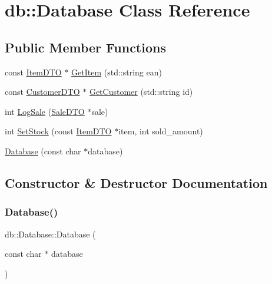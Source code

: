\hypertarget{classdb_1_1Database}{}\section{db\+:\+:Database Class Reference}
\label{classdb_1_1Database}
\subsection*{Public Member Functions}
\begin{DoxyCompactItemize}
\item 
const \mbox{\hyperlink{classdb_1_1ItemDTO}{Item\+D\+TO}} $\ast$ \mbox{\hyperlink{classdb_1_1Database_a1fb85ca95813c5b08fa337ee876dcc77}{Get\+Item}} (std\+::string ean)
\item 
const \mbox{\hyperlink{classdb_1_1CustomerDTO}{Customer\+D\+TO}} $\ast$ \mbox{\hyperlink{classdb_1_1Database_a50871011cdeb0a80894f08549240c3fa}{Get\+Customer}} (std\+::string id)
\item 
int \mbox{\hyperlink{classdb_1_1Database_ac2aef162b74c917acdaf11794422c415}{Log\+Sale}} (\mbox{\hyperlink{classdb_1_1SaleDTO}{Sale\+D\+TO}} $\ast$sale)
\item 
int \mbox{\hyperlink{classdb_1_1Database_a777611636e84a82dc2bbd2be10491bb7}{Set\+Stock}} (const \mbox{\hyperlink{classdb_1_1ItemDTO}{Item\+D\+TO}} $\ast$item, int sold\+\_\+amount)
\item 
\mbox{\hyperlink{classdb_1_1Database_a39fcdd02bf06ce617c4d03581bed22ba}{Database}} (const char $\ast$database)
\end{DoxyCompactItemize}


\subsection{Constructor \& Destructor Documentation}
\mbox{\label{classdb_1_1Database_a39fcdd02bf06ce617c4d03581bed22ba}} 
\subsubsection{\texorpdfstring{Database()}{Database()}}
{\footnotesize\ttfamily db\+::\+Database\+::\+Database (\begin{DoxyParamCaption}\item[{const char $\ast$}]{database }\end{DoxyParamCaption})}

